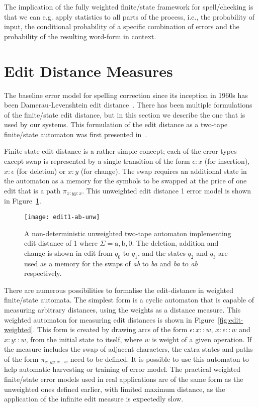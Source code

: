 \documentclass[officiallayout]{unihelcompling}
\begin{document}
The implication of the fully weighted finite\-/state framework for
spell\-/checking is that we can e.g. apply statistics to all parts of the
process, i.e., the probability of input, the conditional probability of a
specific combination of errors and the probability of the resulting word-form
in context. 

\section{Edit Distance Measures}
\label{sec:edit-distance}

The baseline error model for spelling correction since its inception in 1960s
has been Damerau-Levenshtein edit
distance~\citep{damerau1964technique,levenshtein1966binary}. There has been
multiple formulations of the finite\-/state edit distance, but in this section
we describe the one that is used by our systems. This formulation of the edit
distance as a two-tape finite\-/state automaton was first presented
in~\citet{schulz2002fast}.

Finite-state edit distance is a rather simple concept; each of the error types
except swap is represented by a single transition of the form $\epsilon:x$ (for
insertion), $x:\epsilon$ (for deletion) or $x:y$ (for change). The swap
requires an additional state in the automaton as a memory for the symbols to be
swapped at the price of one edit that is a path $\pi_{x:y y:x}$. This
unweighted edit distance 1 error model is shown in Figure~\ref{fig:edit1-ab}.

\begin{figure}
    \texttt{[image: edit1-ab-unw]}
    \caption{A non-deterministic unweighted two-tape automaton implementing
        edit distance of 1 where $\Sigma = {\mathrm{a}, \mathrm{b}, 0}$.
        The deletion, addition and change is shown in
        edit from $q_0$ to $q_1$, and the states $q_2$ and $q_3$ are used as a
        memory for the swaps of \emph{ab} to \emph{ba} and \emph{ba} to
        \emph{ab} respectively.  \label{fig:edit1-ab}}
\end{figure}

There are numerous possibilities to formalise the edit-distance in weighted
finite\-/state automata. The simplest form is a cyclic automaton that is
capable of measuring arbitrary distances, using the weights as a distance
measure. This weighted automaton for measuring edit distances is shown in
Figure~\ref{fig:edit-weighted}. This form is created by drawing arcs of the
form $\epsilon:x::w$, $x:\epsilon::w$ and $x:y::w$, from the initial state to
itself, where $w$ is weight of a given operation. If the measure includes the
swap of adjacent characters, the extra states and paths of the form $\pi_{x:y
y:x::w}$ need to be defined. It is possible to use this automaton to help
automatic harvesting or training of error model. The practical weighted
finite\-/state error models used in real applications are of the same form as
the unweighted ones defined earlier, with limited maximum distance, as the
application of the infinite edit measure is expectedly slow.
\end{document}
